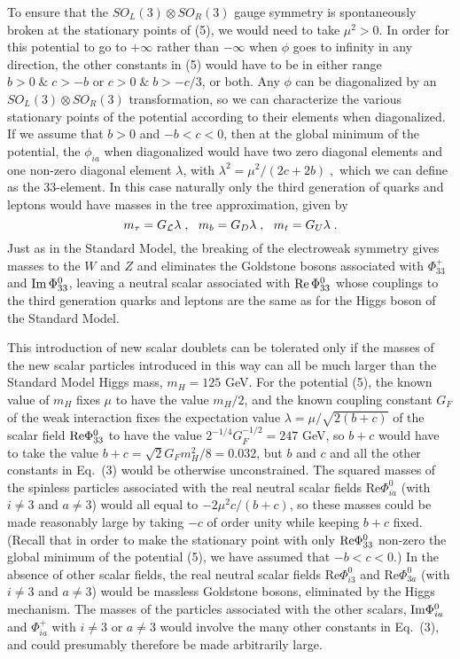\documentclass[12pt]{article}
\begin{document}
To ensure that the  $SO_L(3)\otimes  SO_R(3)$ gauge symmetry is spontaneously broken at the stationary points of (5), we would need to take $\mu^2>0$.  In order for this potential to go to $+\infty$ rather than $-\infty$ when $\phi$ goes to infinity in any direction, the other constants in (5) would have to be in either range $
b>0\;\&\;c>-b$ or $c>0\;\&\; b>-c/3$,
or both.
Any $\phi$ can be diagonalized by an $SO_L(3)\otimes  SO_R(3)$ transformation, so we can characterize the various 
stationary points of the potential according to their  elements when diagonalized.  If we assume that $b>0$ and $-b<c<0$, then at the global minimum of the potential, the 
$\phi_{ia}$  when diagonalized would have two zero diagonal elements and one non-zero diagonal element $\lambda$,  with $ \lambda^2 =
 \mu^2/(2c+2b)\;,$ 
which we can define as the 33-element.  In this case naturally only the third generation of quarks and leptons would have masses in the tree approximation, given by
\begin{equation}
m_\tau=G_{\cal L}  \lambda\;,~~m_b=G_D  \lambda\;,~~m_t=G_U  \lambda\;.
\end{equation}
Just as in the Standard Model, the breaking of the electroweak symmetry gives masses to the $W$ and $Z$ and eliminates the Goldstone bosons associated with $\Phi^+_{33}$ 
and ${\rm Im}\,\Phi^0_{33}$, leaving a neutral scalar associated with 
${\rm Re}\,\Phi^0_{33}$ whose couplings to the third generation quarks and leptons are the same as for the Higgs boson of the Standard Model.  

This introduction of  new scalar doublets can be tolerated only if the masses of the new scalar particles introduced in this way can all be much larger than the Standard Model Higgs mass, $m_H=125$ GeV.  For the potential (5), the known value of $m_H$  fixes $\mu$  to have the value $m_H/2$, and the known coupling constant 
$G_F$ of the weak interaction fixes the expectation value $\lambda=\mu/\sqrt{2(b+c)}$ of the scalar field ${\rm Re}\Phi^0_{33}$ to have the value $2^{-1/4}G_F^{-1/2}=247$ GeV, so  $b+c$ would have to take  the value $b+c=\sqrt{2}G_Fm_H^2/8=0.032$, but $b$ and $c$ and all the other constants in Eq.~(3) would be otherwise unconstrained.  The squared masses of the spinless particles  associated with the real neutral scalar fields  Re$\Phi_{ia}^0$ (with $i\neq 3$ and $a\neq 3$) would all equal to  $-2\mu^2 c/(b+c)$, so these masses could be made reasonably large by taking $-c$ of order unity while keeping $b+c$ fixed.    (Recall that in order to make the stationary point with only ${\rm Re}\Phi^0_{33}$ non-zero the global minimum of the potential (5), we have assumed that $-b<c<0$.) In the absence of other scalar fields, the real neutral scalar fields  Re$\Phi_{i3}^0$ and Re$\Phi_{3a}^0$ (with $i\neq 3$ and $a\neq 3$) would be massless Goldstone bosons,  eliminated by the Higgs mechanism.    The masses of  the particles associated with the other scalars, ${\rm Im}\Phi^0_{ia}$ and $\Phi^+_{ia}$ with $i\neq 3$ or $a\neq 3$ would involve the many other constants in Eq.~(3), and could  presumably therefore be made arbitrarily large.    
\end{document}
